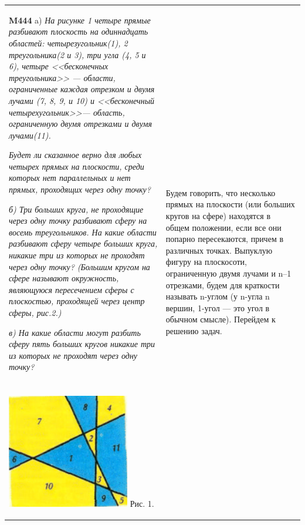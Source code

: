 \begin{tabular}{p{50mm} p{120mm}}
        
    \textbf{M444} a) \textit{На рисунке 1 четыре прямые разбивают плоскость на одиннадцать областей: четырезугольник(1), 2 треугольника(2 и 3), три угла (4, 5 и 6), четыре <<бесконечных треугольника>> --- области, ограниченные каждая отрезком и двумя лучами (7, 8, 9, и 10) и <<бесконечный четырехугольник>>--- область, ограниченную двумя отрезками и двумя лучами(11).}
    
    \textit{Будет ли сказанное верно для любых четырех прямых на плоскости, среди которых нет параллельных и нет прямых, проходящих через одну точку?}
    
    \textit{б) Три больших круга, не проходящие через одну точку разбивают сферу на восемь треугольников. На какие области разбивают сферу четыре больших круга, никакие три из которых не проходят через одну точку? (Большим кругом на сфере называют окружность, являющуюся пересечением сферы с плоскостью, проходящей через центр сферы, рис.2.)}
    
    \textit{в) На какие области могут разбить сферу пять больших кругов никакие три из которых не проходят через одну точку?}

    
    \section*{}
    \vspace{-4mm}
    \includegraphics[width=1.0\linewidth]{img}
    Рис. 1.
& 
    Будем говорить, что несколько прямых на плоскости (или больших кругов на сфере) находятся в общем положении, если все они попарно пересекаются, причем в различных точках. Выпуклую фигуру на плоскосоти, ограниченную двумя лучами и n--1 отрезками, будем для краткости называть n-углом (у n-угла n вершин, 1-угол --- это угол в обычном смысле). Перейдем к решению задач.


\end{tabular}
